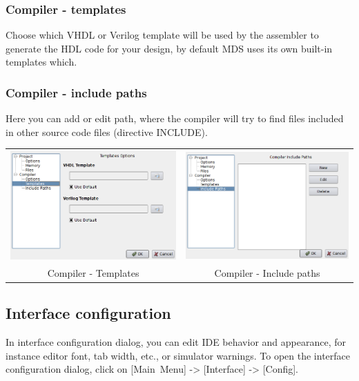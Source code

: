         \subsubsection{Compiler - templates}
            Choose which VHDL or Verilog template will be used by the assembler to generate the HDL code for your
            design, by default MDS uses its own built-in templates which.

        \subsubsection{Compiler - include paths}
            Here you can add or edit path, where the compiler will try to find files included in other source code files
            (directive INCLUDE).

        \begin{table}[h!]
            \begin{tabular}{cc}
                \includegraphics[width=.5\textwidth]{img/config5.png}
                    &
                \includegraphics[width=.5\textwidth]{img/config6.png}
                    \\
                Compiler - Templates & Compiler - Include paths
            \end{tabular}
            \end{table}

\subsection{Interface configuration}
    In interface configuration dialog, you can edit IDE behavior and appearance, for instance editor font, tab width,
    etc., or simulator warnings. To open the interface configuration dialog, click on [Main~Menu] -> [Interface] ->
    [Config].

